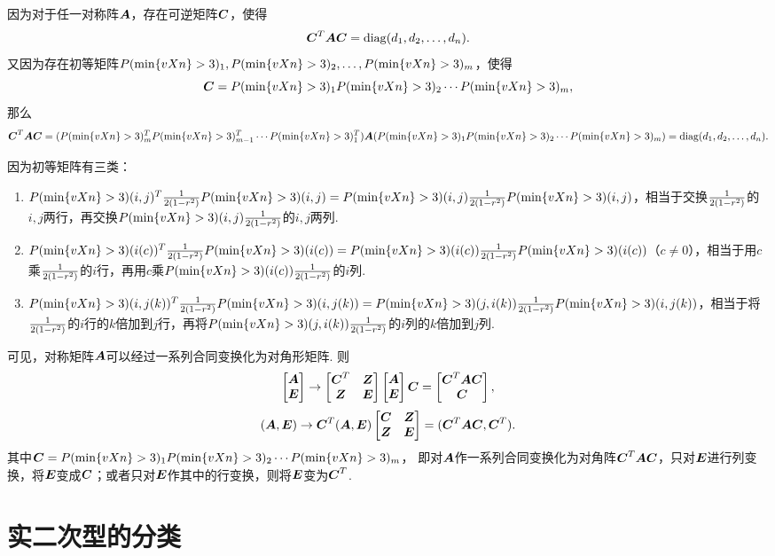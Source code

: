 \begin{theorem}
因为对于任一对称阵\(\A\)，存在可逆矩阵\(\C\)，使得\[
\C^T\A\C=\diag(d_1,d_2,\dotsc,d_n).
\]
又因为存在初等矩阵\(\P_1,\P_2,\dotsc,\P_m\)，使得\[
\C=\P_1\P_2\dotsm\P_m,
\]那么\[
\C^T\A\C = (\P_m^T\P_{m-1}^T\dotsm\P_1^T)\A(\P_1\P_2\dotsm\P_m)=\diag(d_1,d_2,\dotsc,d_n).
\]

因为初等矩阵有三类：
\begin{enumerate}
\item \(\P(i,j)^T\B\P(i,j)=\P(i,j)\B\P(i,j)\)，相当于交换\(\B\)的\(i,j\)两行，再交换\(\P(i,j)\B\)的\(i,j\)两列.
\item \(\P(i(c))^T\B\P(i(c))=\P(i(c))\B\P(i(c))\)（\(c \neq 0\)），相当于用\(c\)乘\(\B\)的\(i\)行，再用\(c\)乘\(\P(i(c))\B\)的\(i\)列.
\item \(\P(i,j(k))^T\B\P(i,j(k))=\P(j,i(k))\B\P(i,j(k))\)，相当于将\(\B\)的\(i\)行的\(k\)倍加到\(j\)行，再将\(\P(j,i(k))\B\)的\(i\)列的\(k\)倍加到\(j\)列.
\end{enumerate}
可见，对称矩阵\(\A\)可以经过一系列合同变换化为对角形矩阵.
则\[
\begin{bmatrix} \A \\ \E \end{bmatrix}
\to
\begin{bmatrix} \C^T & \z \\ \z & \E \end{bmatrix}
\begin{bmatrix} \A \\ \E \end{bmatrix}
\C = \begin{bmatrix} \C^T\A\C \\ \C \end{bmatrix},
\]\[
(\A,\E)
\to
\C^T (\A,\E) \begin{bmatrix}
\C & \z \\
\z & \E
\end{bmatrix}
= (\C^T\A\C,\C^T).
\]其中\(\C=\P_1\P_2\dotsm\P_m\)，%
即对\(\A\)作一系列合同变换化为对角阵\(\C^T\A\C\)，只对\(\E\)进行列变换，将\(\E\)变成\(\C\)；或者只对\(\E\)作其中的行变换，则将\(\E\)变为\(\C^T\).
\end{theorem}

\section{实二次型的分类}
